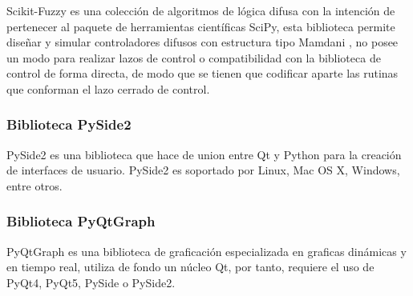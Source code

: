             Scikit-Fuzzy es una colección de algoritmos de lógica difusa con la intención de pertenecer al paquete de herramientas científicas SciPy, esta biblioteca permite diseñar y simular controladores difusos con estructura tipo Mamdani \Parencite{warner2016fuzzy}, no posee un modo para realizar lazos de control o compatibilidad con la biblioteca de control de forma directa, de modo que se tienen que codificar aparte las rutinas que conforman el lazo cerrado de control.

        \subsubsection{Biblioteca PySide2}

            PySide2 es una biblioteca que hace de union entre Qt y Python para la creación de interfaces de usuario. PySide2 es soportado por Linux, Mac OS X, Windows, entre otros.
            
        \subsubsection{Biblioteca PyQtGraph}
                
            PyQtGraph es una biblioteca de graficación especializada en graficas dinámicas y en tiempo real, utiliza de fondo un núcleo Qt, por tanto, requiere el uso de PyQt4, PyQt5, PySide o PySide2.
